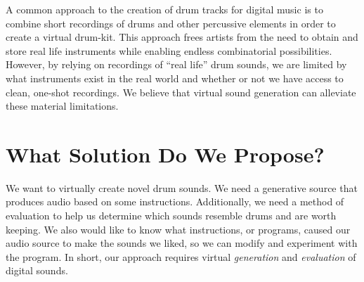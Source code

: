 \documentclass[\main/thesis.tex]{subfiles}
\begin{document}
A common approach to the creation of drum tracks for digital music is to combine short recordings of drums and other percussive elements in order to create a virtual drum-kit. This approach frees artists from the need to obtain and store real life instruments while enabling endless combinatorial possibilities. However, by relying on recordings of \enquote{real life} drum sounds, we are limited by what instruments exist in the real world and whether or not we have access to clean, one-shot recordings. We believe that virtual sound generation can alleviate these material limitations. 
 
\section{What Solution Do We Propose?}
We want to virtually create novel drum sounds. We need a generative source that produces audio based on some instructions. Additionally, we need a method of evaluation to help us determine which sounds resemble drums and are worth keeping. We also would like to know what instructions, or programs, caused our audio source to make the sounds we liked, so we can modify and experiment with the program. In short, our approach requires virtual \textit{generation} and \textit{evaluation} of digital sounds.   
\end{document}
